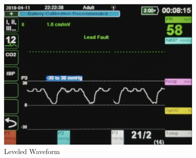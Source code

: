 \documentclass[12pt]{report}
\begin{document}
\begin{figure}[h!]
\includegraphics[width = 10cm]{Leveled.png}
\centering
\caption{Leveled Waveform}
\end{figure}
\newpage
\end{document}
